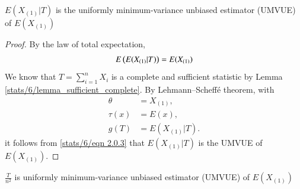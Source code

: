 %
\begin{proposition} \label{stats/6/prop_3.1}
$E(X_{(1)}|T)$ is the uniformly minimum-variance unbiased estimator (UMVUE) of $E(X_{(1)})$
\end{proposition}
\begin{proof}
By the law of total expectation, 
\begin{align}
\label{stats/6/eqn 2.0.3}
E\left(E(X_{(1)} | T )\right) = E(X_{(1)})
\end{align}
We know that $T = \sum_{i=1}^n X_i$ is a complete and sufficient statistic by Lemma \ref{stats/6/lemma_sufficient_complete}. By Lehmann–Scheffé theorem, with
\begin{align}
\theta &= X_{(1)},\\ 
\tau(x) &= E(x),\\
g(T) &= E(X_{(1)} | T).
\end{align}
it follows from \eqref{stats/6/eqn 2.0.3} that $E(X_{(1)} | T)$ is the UMVUE of $E(X_{(1)})$.
\end{proof}
\begin{proposition} \label{stats/6/prop_3.2}
$\frac{T}{n^2}$ is uniformly minimum-variance unbiased estimator (UMVUE) of $E(X_{(1)})$
\end{proposition}
